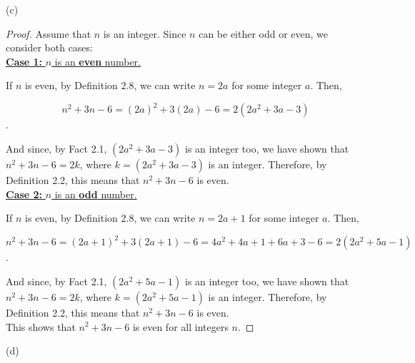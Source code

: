 \documentclass{article}
\begin{document}
\newpage

\noindent(c)

\begin{proof}
    Assume that $n$ is an integer. Since $n$ can be either odd or even, we consider both cases:\\

    \noindent \underline{\textbf{Case 1:} $n$ is an \textbf{even} number.}
    
    \noindent If $n$ is even, by Definition 2.8, we can write $n = 2a$ for some integer $a$. Then,

    \[n^2+3n-6=(2a)^2+3(2a)-6=2(2a^2+3a-3)\].

    And since, by Fact 2.1, $(2a^2+3a-3)$ is an integer too, we have shown that $n^2+3n-6=2k$, where $k=(2a^2+3a-3)$ is an integer. Therefore, by Definition 2.2, this means that $n^2+3n-6$ is even.\\

    \noindent \underline{\textbf{Case 2:} $n$ is an \textbf{odd} number.}
    
    \noindent If $n$ is even, by Definition 2.8, we can write $n = 2a+1$ for some integer $a$. Then,

    \[n^2+3n-6=(2a+1)^2+3(2a+1)-6=4a^2+4a+1+6a+3-6=2(2a^2+5a-1)\].

    And since, by Fact 2.1, $(2a^2+5a-1)$ is an integer too, we have shown that $n^2+3n-6=2k$, where $k=(2a^2+5a-1)$ is an integer. Therefore, by Definition 2.2, this means that $n^2+3n-6$ is even.\\

    This shows that $n^2+3n-6$ is even for all integers $n$.
\end{proof}

\noindent(d)
\end{document}
